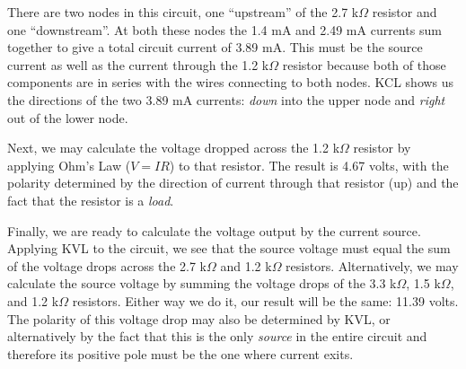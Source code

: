 There are two nodes in this circuit, one ``upstream'' of the 2.7 k$\Omega$ resistor and one ``downstream''.  At both these nodes the 1.4 mA and 2.49 mA currents sum together to give a total circuit current of 3.89 mA.  This must be the source current as well as the current through the 1.2 k$\Omega$ resistor because both of those components are in series with the wires connecting to both nodes.  KCL shows us the directions of the two 3.89 mA currents: {\it down} into the upper node and {\it right} out of the lower node.

Next, we may calculate the voltage dropped across the 1.2 k$\Omega$ resistor by applying Ohm's Law ($V = I R$) to that resistor.  The result is 4.67 volts, with the polarity determined by the direction of current through that resistor (up) and the fact that the resistor is a {\it load}.

Finally, we are ready to calculate the voltage output by the current source.  Applying KVL to the circuit, we see that the source voltage must equal the sum of the voltage drops across the 2.7 k$\Omega$ and 1.2 k$\Omega$ resistors.  Alternatively, we may calculate the source voltage by summing the voltage drops of the 3.3 k$\Omega$, 1.5 k$\Omega$, and 1.2 k$\Omega$ resistors.  Either way we do it, our result will be the same: 11.39 volts.  The polarity of this voltage drop may also be determined by KVL, or alternatively by the fact that this is the only {\it source} in the entire circuit and therefore its positive pole must be the one where current exits.




